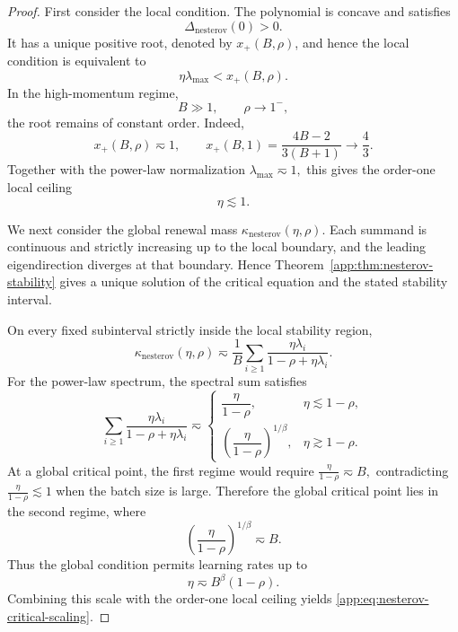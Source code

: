 \documentclass[11pt]{article}
\newcommand{\nesterov}{\mathrm{nesterov}}
\begin{document}
\begin{proof}
First consider the local condition. The polynomial is concave and satisfies
\[
\Delta_{\nesterov}(0)>0.
\]
It has a unique positive root, denoted by \(x_+(B,\rho)\), and hence the local condition is
equivalent to
\[
\eta\lambda_{\max}<x_+(B,\rho).
\]
In the high-momentum regime,
\[
B\gg1,
\qquad
\rho\to1^-,
\]
the root remains of constant order. Indeed,
\[
x_+(B,\rho)\eqsim1,
\qquad
x_+(B,1)
=
\frac{4B-2}{3(B+1)}
\longrightarrow
\frac43.
\]
Together with the power-law normalization
\(\lambda_{\max}\eqsim1,\)
this gives the order-one local ceiling
\[
\eta\lesssim1.
\]

We next consider the global renewal mass \(\kappa_{\nesterov}(\eta,\rho)\). Each summand is continuous and strictly increasing up to
the local boundary, and the leading eigendirection diverges at that boundary. Hence
Theorem~\ref{app:thm:nesterov-stability} gives a unique solution of the critical equation and the
stated stability interval.

On every fixed subinterval strictly inside the local stability region,
\[
\kappa_{\nesterov}(\eta,\rho)
\eqsim
\frac1B
\sum_{i\geq1}
\frac{\eta\lambda_i}{1-\rho+\eta\lambda_i}.
\]
For the power-law spectrum, the spectral sum satisfies
\[
\sum_{i\geq1}
\frac{\eta\lambda_i}{1-\rho+\eta\lambda_i}
\eqsim
\begin{cases}
\dfrac{\eta}{1-\rho},
&
\eta\lesssim1-\rho,
\\[3mm]
\left(\dfrac{\eta}{1-\rho}\right)^{1/\beta},
&
\eta\gtrsim1-\rho.
\end{cases}
\]
At a global critical point, the first regime would require
\(
\frac{\eta}{1-\rho}\eqsim B,
\)
contradicting
\(
\frac{\eta}{1-\rho}\lesssim1
\)
when the batch size is large. Therefore the global critical point lies in the second regime, where
\[
\left(\frac{\eta}{1-\rho}\right)^{1/\beta}
\eqsim
B.
\]
Thus the global condition permits learning rates up to
\[
\eta\eqsim B^\beta(1-\rho).
\]
Combining this scale with the order-one local ceiling yields
\eqref{app:eq:nesterov-critical-scaling}.
\end{proof}



\end{document}
